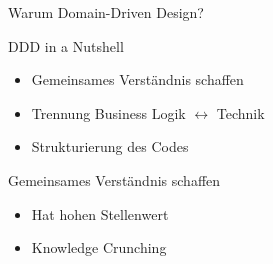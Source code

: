 \begin{frame}[fragile]{}

\begin{center}
{
\LARGE
Warum Domain-Driven Design?
}
\end{center}

\end{frame}

\begin{frame}[fragile]{DDD in a Nutshell}

\begin{itemize}
\item Gemeinsames Verständnis schaffen
\item Trennung Business Logik $\leftrightarrow$ Technik
\item Strukturierung des Codes
\end{itemize}

\end{frame}


\begin{frame}[fragile]{Gemeinsames Verständnis schaffen}

\begin{itemize}
\item Hat hohen Stellenwert
\item \glqq Knowledge Crunching\grqq
\end{itemize}

\end{frame}

